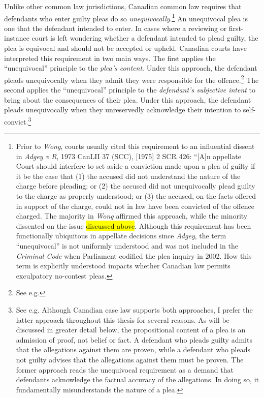 Unlike other common law jurisdictions, Canadian common law requires that defendants who enter guilty pleas do so \textit{unequivocally}.\footnote{Prior to \textit{Wong}, courts usually cited this requirement to an influential dissent in \textit{Adgey v R}, 1973 CanLII 37 (SCC), [1975] 2 SCR 426: ``[A]n appellate Court should interfere to set aside a conviction made upon a plea of guilty if it be the case that (1) the accused did not understand the nature of the charge before pleading; or (2) the accused did not unequivocally plead guilty to the charge as properly understood; or (3) the accused, on the facts offered in support of the charge, could not in law have been convicted of the offence charged. The majority in \textit{Wong} affirmed this approach, while the minority dissented on the issue \hl{discussed above}. Although this requirement has been functionally ubiquitous in appellate decisions since \textit{Adgey}, the term ``unequivocal'' is not uniformly understood and was not included in the \textit{Criminal Code} when Parliament codified the plea inquiry in 2002. How this term is explicitly understood impacts whether Canadian law permits exculpatory no-contest pleas.} An unequivocal plea is one that the defendant intended to enter. In cases where a reviewing or first-instance court is left wondering whether a defendant intended to plead guilty, the plea is equivocal and should not be accepted or upheld. Canadian courts have interpreted this requirement in two main ways. The first applies the ``unequivocal'' principle to the \textit{plea's content}. Under this approach, the defendant pleads unequivocally when they admit they were responsible for the offence.\footnote{See e.g. } The second applies the ``unequivocal'' principle to the \textit{defendant's subjective intent} to bring about the consequences of their plea. Under this approach, the defendant pleads unequivocally when they unreservedly acknowledge their intention to self-convict.\footnote{See e.g. Although Canadian case law supports both approaches, I prefer the latter approach throughout this thesis for several reasons. As will be discussed in greater detail below, the propositional content of a plea is an admission of proof, not belief or fact. A defendant who pleads guilty admits that the allegations against them are proven, while a defendant who pleads not guilty advises that the allegations against them must be proven. The former approach reads the unequivocal requirement as a demand that defendants acknowledge the factual accuracy of the allegations. In doing so, it fundamentally misunderstands the nature of a plea.} 

